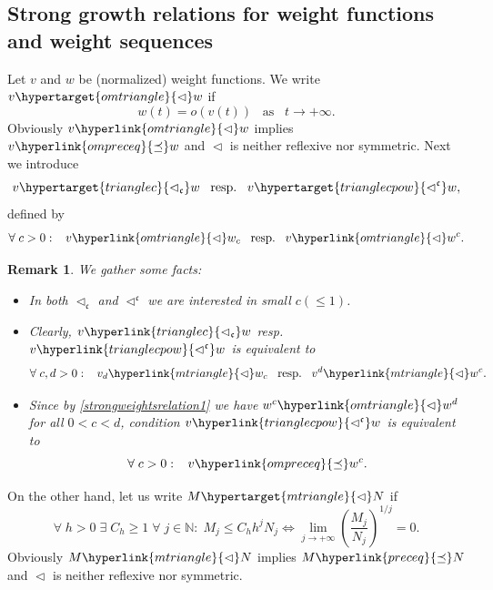\documentclass[10pt]{amsart}%
\numberwithin{equation}{section}
\theoremstyle{plain}
\newtheorem{remark}[proposition]{Remark}
\newcommand{\NN}{\mathbb{N}}
\begin{document}
\subsection{Strong growth relations for weight functions and weight sequences}
Let $v$ and $w$ be (normalized) weight functions. We write $v\hypertarget{omtriangle}{\vartriangleleft}w$ if
$$w(t)=o(v(t))\;\;\;\text{as}\;\;\;t\rightarrow+\infty.$$
Obviously $v\hyperlink{omtriangle}{\vartriangleleft}w$ implies $v\hyperlink{ompreceq}{\preceq}w$ and \hyperlink{omtriangle}{$\vartriangleleft$} is neither reflexive nor symmetric. Next we introduce
$$v\hypertarget{trianglec}{\vartriangleleft_{\mathfrak{c}}}w\;\;\;\text{resp.}\;\;\;v\hypertarget{trianglecpow}{\vartriangleleft^{\mathfrak{c}}}w,$$ defined by
$$\forall\;c>0:\;\;\;v\hyperlink{omtriangle}{\vartriangleleft}w_c\;\;\;\text{resp.}\;\;\;v\hyperlink{omtriangle}{\vartriangleleft}w^c.$$

\begin{remark}\label{strongconfusionrem}
	\emph{We gather some facts:}
	\begin{itemize}
		\item[$(i)$] \emph{In both \hyperlink{trianglec}{$\vartriangleleft_{\mathfrak{c}}$} and \hyperlink{trianglecpow}{$\vartriangleleft^{\mathfrak{c}}$} we are interested in small $c(\le 1)$.}
		
		\item[$(ii)$] \emph{Clearly, $v\hyperlink{trianglec}{\vartriangleleft_{\mathfrak{c}}}w$ resp. $v\hyperlink{trianglecpow}{\vartriangleleft^{\mathfrak{c}}}w$ is equivalent to}
		\begin{equation}\label{strongweightrelation}
			\forall\;c,d>0:\;\;\;v_d\hyperlink{mtriangle}{\vartriangleleft}w_c\;\;\;\text{resp.}\;\;\;v^d\hyperlink{mtriangle}{\vartriangleleft}w^c.
		\end{equation}
		
		\item[$(iii)$] \emph{Since by \eqref{strongweightsrelation1} we have $w^c\hyperlink{omtriangle}{\vartriangleleft}w^d$ for all $0<c<d$, condition $v\hyperlink{trianglecpow}{\vartriangleleft^{\mathfrak{c}}}w$ is equivalent to}
		\begin{equation}\label{strongweightrelationpow}
			\forall\;c>0:\;\;\;v\hyperlink{ompreceq}{\preceq}w^c.
		\end{equation}
	\end{itemize}
\end{remark}

On the other hand, let us write $M\hypertarget{mtriangle}{\vartriangleleft}N$ if
$$\forall\;h>0\;\exists\;C_h\ge 1\;\forall\;j\in\NN:\; M_j\le C_hh^jN_j\Longleftrightarrow\lim_{j\rightarrow+\infty}\left(\frac{M_j}{N_j}\right)^{1/j}=0.$$
Obviously $M\hyperlink{mtriangle}{\vartriangleleft}N$ implies $M\hyperlink{preceq}{\preceq}N$ and \hyperlink{mtriangle}{$\vartriangleleft$} is neither reflexive nor symmetric.
\end{document}
